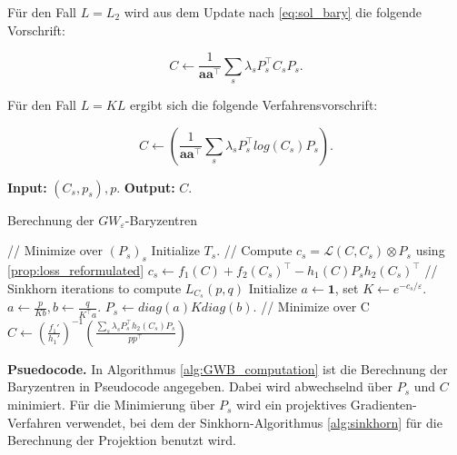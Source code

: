 \documentclass[twoside, 12pt,a4paper]{book}
\numberwithin{equation}{section}
\begin{document}
	
	\noindent Für den Fall $L=L_2$ wird aus dem Update nach \eqref{eq:sol_bary} die folgende Vorschrift:
	
	\begin{equation}
	C \leftarrow \frac{1}{\boldsymbol{a}\boldsymbol{a}^\top}\sum_s{\lambda_s P_s^\top C_s P_s}. \label{eq:update_forL=L2}
	\end{equation}
	
	\noindent Für den Fall $L = KL$ ergibt sich die folgende Verfahrensvorschrift:
	
	\begin{equation}
	C \leftarrow \left(\frac{1}{\boldsymbol{a}\boldsymbol{a}^\top}\sum_s{\lambda_s P_s^\top log(C_s)P_s}\right).
	\end{equation}
	\begin{algorithm}
		\hspace*{\algorithmicindent} \textbf{Input: } $(C_s,p_s), p.$ \newline
		\hspace*{\algorithmicindent} \textbf{Output: } $C$. 
		\caption{Berechnung der $GW_{\varepsilon}$-Baryzentren}
		\label{alg:GWB_computation}
		\begin{algorithmic}
			\REPEAT 
			\STATE// Minimize over $(P_s)_s$
			\STATE Initialize $T_s$.
			\REPEAT
			\STATE // Compute $c_s = \mathcal{L}(C,C_s)\otimes P_s$ using \eqref{prop:loss_reformulated}
			\STATE $c_s \leftarrow f_1(C) + f_2(C_s)^\top -h_1(C)P_sh_2(C_s)^\top$
			\STATE // Sinkhorn iterations to compute $L_{C_s}(p,q)$
			\STATE Initialize $a \leftarrow \boldsymbol{1}$, set $K \leftarrow e^{-c_s/\varepsilon}.$
			\REPEAT 
			\STATE $a \leftarrow \frac{p}{Kb}, b \leftarrow  \frac{q}{K^\top a}.$
			\STATE $P_s \leftarrow diag(a)Kdiag(b).$
			\ENDFOR 
			\STATE // Minimize over C 
			\STATE $C \leftarrow \left( \frac{f_1'}{h_1'} \right)^{-1}\left( \frac{\sum_s{\lambda_sP_s^\top h_2(C_s)P_s}}{pp^\top} \right)$ 
		\end{algorithmic}
	\end{algorithm}
	
	\noindent \textbf{Psuedocode.}
	In Algorithmus \autoref{alg:GWB_computation} ist die Berechnung der Baryzentren in Pseudocode angegeben. Dabei wird abwechselnd über $P_s$ und $C$ minimiert. Für die Minimierung über $P_s$ wird ein projektives Gradienten-Verfahren verwendet, bei dem der Sinkhorn-Algorithmus \autoref{alg:sinkhorn} für die Berechnung der Projektion benutzt wird.
	
\end{document}
